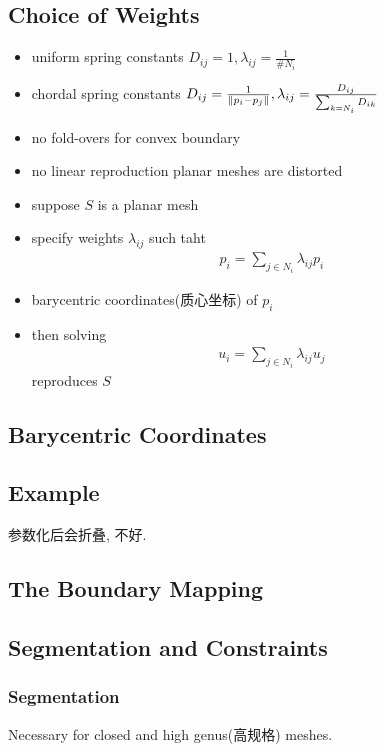 \subsection{Choice of Weights}
\begin{itemize}
    \item uniform spring constants
    \subitem $D_{ij}=1, \lambda_{ij}=\frac{1}{\# N_i}$
    \item chordal spring constants
    \subitem $D_{ij}=\frac{1}{\left\lVert p_i-p_j\right\rVert}, \lambda_{ij}=\frac{D_{ij}}{\sum_{k=N_i}D_{ik}}$
    \item no fold-overs for convex boundary
    \item no linear reproduction
    \subitem planar meshes are distorted
    \item suppose $S$ is a planar mesh
    \item specify weights $\lambda_{ij}$ such taht
    \begin{align*}
        p_i=\sum_{j\in N_i}\lambda_{ij}p_i
    \end{align*}
    \item barycentric coordinates(质心坐标) of $p_i$
    \item then solving
    \begin{align*}
        u_i=\sum_{j\in N_i}\lambda_{ij}u_j
    \end{align*}
    reproduces $S$
\end{itemize}

\subsection{Barycentric Coordinates}

\subsection{Example}
参数化后会折叠, 不好.

\subsection{The Boundary Mapping}

\subsection{Segmentation and Constraints}
\subsubsection{Segmentation}
Necessary for closed and high genus(高规格) meshes. 

